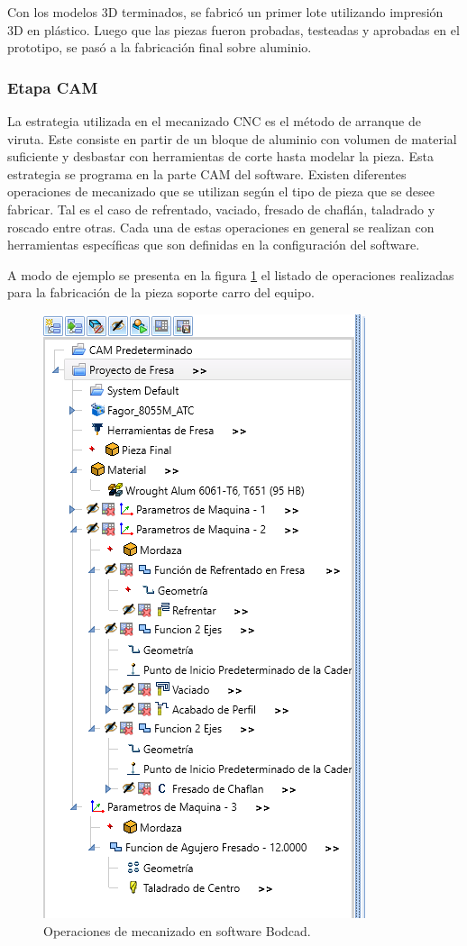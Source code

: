 Con los modelos 3D terminados, se fabricó un primer lote utilizando impresión 3D en plástico.
Luego que las piezas fueron probadas, testeadas y aprobadas en el prototipo, se pasó a la fabricación final sobre aluminio.

\subsubsection{Etapa CAM}

La estrategia utilizada en el mecanizado CNC es el método de arranque de viruta. Este consiste en partir de un bloque de aluminio con volumen de material suficiente y desbastar con herramientas de corte hasta modelar la pieza. Esta estrategia se programa en la parte CAM del software. Existen diferentes operaciones de mecanizado que se utilizan según el tipo de pieza que se desee fabricar. Tal es el caso de refrentado, vaciado, fresado de chaflán, taladrado y roscado entre otras. Cada una de estas operaciones  en general se realizan con herramientas específicas que son definidas en la configuración del software.

A modo de ejemplo se presenta en la figura \ref{fig:estrategia} el listado de operaciones realizadas para la fabricación de la pieza soporte carro del equipo.

\begin{figure}[h]
	\centering
	\includegraphics[width=.6\textwidth]{./Figures/3d_estrategia.png}
	\caption{Operaciones de mecanizado en software Bodcad.}
	\label{fig:estrategia}
\end{figure}

